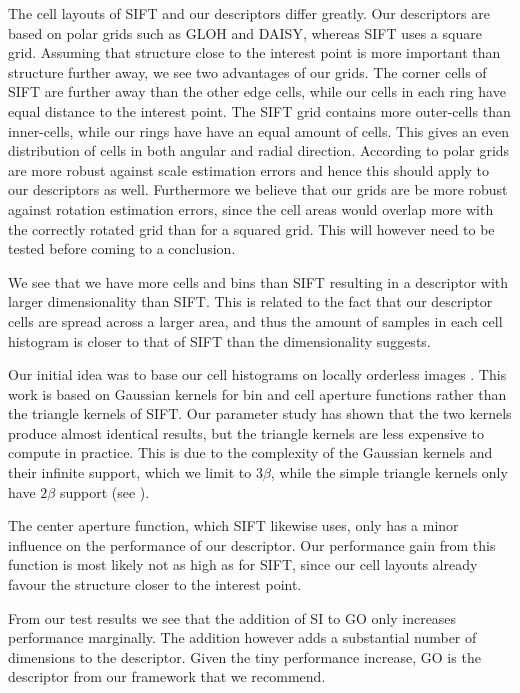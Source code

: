 \documentclass[thesis.tex]{subfiles}
\begin{document}
The cell layouts of SIFT and our descriptors differ greatly. Our descriptors are based on polar grids such as GLOH and DAISY, whereas SIFT uses a square grid. Assuming that structure close to the interest point is more important than structure further away, we see two advantages of our grids. The corner cells of SIFT are further away than the other edge cells, while our cells in each ring have equal distance to the interest point. The SIFT grid contains more outer-cells than inner-cells, while our rings have have an equal amount of cells. This gives an even distribution of cells in both angular and radial direction. According to \citet{cui2009scale} polar grids are more robust against scale estimation errors and hence this should apply to our descriptors as well. Furthermore we believe that our grids are be more robust against rotation estimation errors, since the cell areas would overlap more with the correctly rotated grid than for a squared grid. This will however need to be tested before coming to a conclusion.

We see that we have more cells and bins than SIFT resulting in a descriptor with larger dimensionality than SIFT. This is related to the fact that our descriptor cells are spread across a larger area, and thus the amount of samples in each cell histogram is closer to that of SIFT than the dimensionality suggests.

Our initial idea was to base our cell histograms on locally orderless images \cite{koenderink1999structure}. This work is based on Gaussian kernels for bin and cell aperture functions rather than the triangle kernels of SIFT. Our parameter study has shown that the two kernels produce almost identical results, but the triangle kernels are less expensive to compute in practice. This is due to the complexity of the Gaussian kernels and their infinite support, which we limit to 3$\beta$, while the simple triangle kernels only have $2\beta$ support (see ).

The center aperture function, which SIFT likewise uses, only has a minor influence on the performance of our descriptor. Our performance gain from this function is most likely not as high as for SIFT, since our cell layouts already favour the structure closer to the interest point.

From our test results we see that the addition of SI to GO only increases performance marginally. The addition however adds a substantial number of dimensions to the descriptor.
Given the tiny performance increase, GO is the descriptor from our framework that we recommend.
\end{document}

